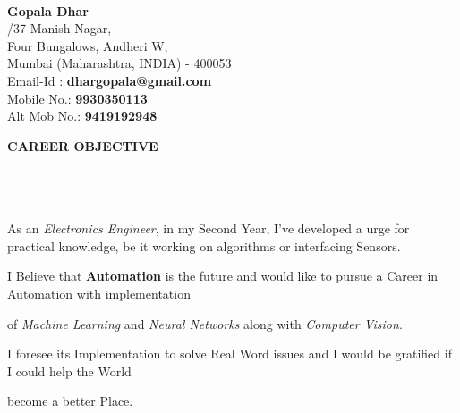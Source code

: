 \documentclass[a4paper,10pt]{article}
\newcommand{\lsep}{-0.5cm}
\newcommand{\resheading}[1]{{\small \colorbox{mygrey}{\begin{minipage}{0.975\textwidth}{\textbf{#1 \vphantom{p\^{E}}}}\end{minipage}}}}
\begin{document}
\hspace{0.5cm}\\[-0.2cm]
\indent \Large \textbf{Gopala Dhar} \\         
\normalsize
{}/37 Manish Nagar, \\
\indent Four Bungalows, Andheri W,  \\                                                                                                                                                                                                                                                           
\indent Mumbai (Maharashtra, INDIA) - 400053\\
\indent Email-Id : \textbf{dhargopala@gmail.com} \\
\indent Mobile No.: \textbf{9930350113} \\
\indent Alt Mob No.: \textbf{9419192948} \hfill
{}\\  


\resheading{\textbf{CAREER OBJECTIVE} }\\[\lsep]\\\\
\indent As an \textit{Electronics Engineer}, in my Second Year, I've developed a urge for practical knowledge, be it working \indent on algorithms or interfacing Sensors.\par I Believe that \textbf{Automation} is the future and would like to pursue a Career in Automation with implementation \par of \textit{Machine Learning} and \textit{Neural Networks} along with \textit{Computer Vision}. \par I foresee its Implementation to solve Real Word issues and I would be gratified if I could help the World \par become a better Place.\\
\end{document}
